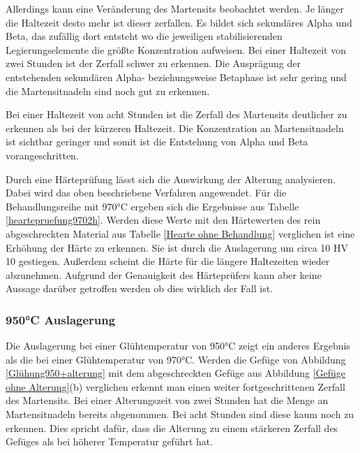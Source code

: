\documentclass[a4paper, 11pt]{tubsreprt}
\begin{document}
Allerdings kann eine Veränderung des Martensits beobachtet werden. Je länger die Haltezeit desto mehr ist dieser zerfallen. Es bildet sich sekundäres Alpha und Beta, das zufällig dort entsteht wo die jeweiligen stabilisierenden Legierungselemente die größte Konzentration aufweisen. Bei einer Haltezeit von zwei Stunden ist der Zerfall schwer zu erkennen. Die Ausprägung der entstehenden sekundären Alpha- beziehungsweise Betaphase ist sehr gering und die Martensitnadeln sind noch gut zu erkennen. 

Bei einer Haltezeit von acht Stunden ist die Zerfall des Martensits deutlicher zu erkennen als bei der kürzeren Haltezeit. Die Konzentration an Martensitnadeln ist sichtbar geringer und somit ist die Entstehung von Alpha und Beta vorangeschritten. 

Durch eine Härteprüfung lässt sich die Auswirkung der Alterung analysieren. Dabei wird das oben beschriebene Verfahren angewendet. Für die Behandlungsreihe mit 970°C ergeben sich die Ergebnisse aus Tabelle \ref{heartepruefung9702h}. Werden diese Werte mit den Härtewerten des rein abgeschreckten Material aus Tabelle \ref{Hearte ohne Behandlung} verglichen ist eine Erhöhung der Härte zu erkennen. Sie ist durch die Auslagerung um circa 10 HV 10 gestiegen. Außerdem scheint die Härte für die längere Haltezeiten wieder abzunehmen. Aufgrund der Genauigkeit des Härteprüfers kann aber keine Aussage darüber getroffen werden ob dies wirklich der Fall ist. 

\subsubsection{950°C Auslagerung}
Die Auslagerung bei einer Glühtemperatur von 950°C zeigt ein anderes Ergebnis als die bei einer Glühtemperatur von 970°C. Werden die Gefüge von Abbildung  \ref{Glühung950+alterung} mit dem abgeschreckten Gefüge aus Abbildung \ref{Gefüge ohne Alterung}(b) verglichen erkennt man einen weiter fortgeschrittenen Zerfall des Martensits. Bei einer Alterungszeit von zwei Stunden hat die Menge an Martensitnadeln bereits abgenommen. Bei acht Stunden sind diese kaum noch zu erkennen. Dies spricht dafür, dass die Alterung zu einem stärkeren Zerfall des Gefüges als bei höherer Temperatur geführt hat. 
\end{document}
